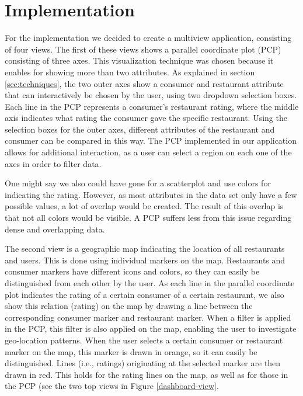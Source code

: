 \section{Implementation}\label{sec:implemenation}

For the implementation we decided to create a multiview application, consisting of four views. The first of these views shows a parallel coordinate plot (PCP) consisting of three axes. This visualization technique was chosen because it enables for showing more than two attributes. As explained in section \ref{sec:techniques}, the two outer axes show a consumer and restaurant attribute that can interactively be chosen by the user, using two dropdown selection boxes. Each line in the PCP represents a consumer's restaurant rating, where the middle axis indicates what rating the consumer gave the specific restaurant. Using the selection boxes for the outer axes, different attributes of the restaurant and consumer can be compared in this way. The PCP implemented in our application allows for additional interaction, as a user can select a region on each one of the axes in order to filter data.

One might say we also could have gone for a scatterplot and use colors for indicating the rating. However, as most attributes in the data set only have a few possible values, a lot of overlap would be created. The result of this overlap is that not all colors would be visible. A PCP suffers less from this issue regarding dense and overlapping data.

The second view is a geographic map indicating the location of all restaurants and users. This is done using individual markers on the map. Restaurants and consumer markers have different icons and colors, so they can easily be distinguished from each other by the user. As each line in the parallel coordinate plot indicates the rating of a certain consumer of a certain restaurant, we also show this relation (rating) on the map by drawing a line between the corresponding consumer marker and restaurant marker. When a filter is applied in the PCP, this filter is also applied on the map, enabling the user to investigate geo-location patterns. When the user selects a certain consumer or restaurant marker on the map, this marker is drawn in orange, so it can easily be distinguished. Lines (i.e., ratings) originating at the selected marker are then drawn in red. This holds for the rating lines on the map, as well as for those in the PCP (see the two top views in Figure \ref{dashboard-view}.


